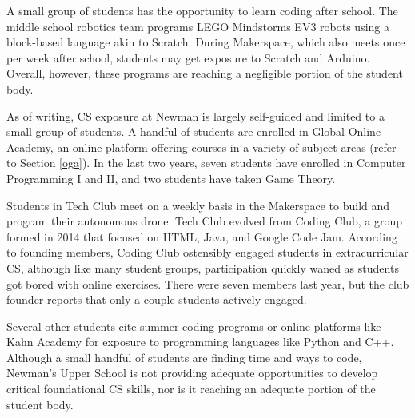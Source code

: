 A small group of students has the opportunity to learn coding after school. The middle school robotics team programs LEGO Mindstorms EV3 robots using a block-based language akin to Scratch. During Makerspace, which also meets once per week after school, students may get exposure to Scratch and Arduino. Overall, however, these programs are reaching a negligible portion of the student body.\par


As of writing, CS exposure at Newman is largely self-guided and limited to a small group of students. A handful of students are enrolled in Global Online Academy, an online platform offering courses in a variety of subject areas (refer to Section \ref{oga}). In the last two years, seven students have enrolled in Computer Programming I and II, and two students have taken Game Theory. \par
Students in Tech Club meet on a weekly basis in the Makerspace to build and program their autonomous drone. Tech Club evolved from Coding Club, a group formed in 2014 that focused on HTML, Java, and Google Code Jam. According to founding members, Coding Club ostensibly engaged students in extracurricular CS, although like many student groups, participation quickly waned as students got bored with online exercises. There were seven members last year, but the club founder reports that only a couple students actively engaged. \par 
Several other students cite summer coding programs or online platforms like Kahn Academy for exposure to programming languages like Python and C++. Although a small handful of students are finding time and ways to code, Newman's Upper School is not providing adequate opportunities to develop critical foundational CS skills, nor is it reaching an adequate portion of the student body.  \par



